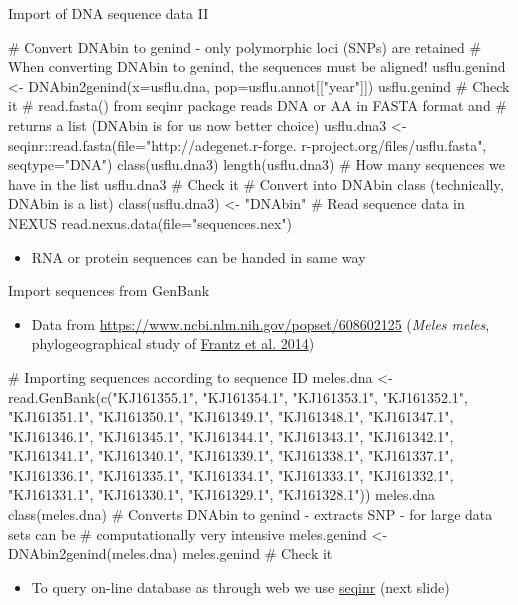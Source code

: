 \documentclass[compress, ucs, xelatex, 11pt, xcolor=svgnames,
  hyperref={
    bookmarks=true,
    unicode=true,
    colorlinks=true,
    pdftitle={Molecular data in R},
    plainpages=false,
    pdfauthor={Vojtech Zeisek},
    pdfsubject={Course about phylogeny and evolution in R},
    pdfcreator={XeLaTeX},
    pdfkeywords={R, evolution, phylogeny, molecular data},
    linkcolor=Tomato,
    anchorcolor=SaddleBrown,
    citecolor=Goldenrod,
    filecolor=DarkMagenta,
    menucolor=Sienna,
    urlcolor=DarkTurquoise,
    pdftex},
  url={hyphens, lowtilde} %
  ]{beamer}
\begin{document}
\begin{frame}[fragile]{Import of DNA sequence data II}
  \begin{spluscode}
    # Convert DNAbin to genind - only polymorphic loci (SNPs) are retained
    # When converting DNAbin to genind, the sequences must be aligned!
    usflu.genind <- DNAbin2genind(x=usflu.dna, pop=usflu.annot[["year"]])
    usflu.genind # Check it
    # read.fasta() from seqinr package reads DNA or AA in FASTA format and
    # returns a list (DNAbin is for us now better choice)
    usflu.dna3 <- seqinr::read.fasta(file="http://adegenet.r-forge.
      r-project.org/files/usflu.fasta", seqtype="DNA")
    class(usflu.dna3)
    length(usflu.dna3) # How many sequences we have in the list
    usflu.dna3 # Check it
    # Convert into DNAbin class (technically, DNAbin is a list)
    class(usflu.dna3) <- "DNAbin"
    # Read sequence data in NEXUS
    read.nexus.data(file="sequences.nex")
  \end{spluscode}
  \begin{itemize}
    \item RNA or protein sequences can be handed in same way
  \end{itemize}
\end{frame}

\begin{frame}[fragile]{Import sequences from GenBank}
  \begin{itemize}
    \item Data from \url{https://www.ncbi.nlm.nih.gov/popset/608602125} (\textit{Meles meles}, phylogeographical study of \href{https://www.nature.com/articles/hdy201445}{Frantz et al. 2014})
  \end{itemize}
  \begin{spluscode}
    # Importing sequences according to sequence ID
    meles.dna <- read.GenBank(c("KJ161355.1", "KJ161354.1", "KJ161353.1",
      "KJ161352.1", "KJ161351.1", "KJ161350.1", "KJ161349.1", "KJ161348.1",
      "KJ161347.1", "KJ161346.1", "KJ161345.1", "KJ161344.1", "KJ161343.1",
      "KJ161342.1", "KJ161341.1", "KJ161340.1", "KJ161339.1", "KJ161338.1",
      "KJ161337.1", "KJ161336.1", "KJ161335.1", "KJ161334.1", "KJ161333.1",
      "KJ161332.1", "KJ161331.1", "KJ161330.1", "KJ161329.1", "KJ161328.1"))
    meles.dna
    class(meles.dna)
    # Converts DNAbin to genind - extracts SNP - for large data sets can be
    # computationally very intensive
    meles.genind <- DNAbin2genind(meles.dna)
    meles.genind # Check it
  \end{spluscode}
  \begin{itemize}
    \item To query on-line database as through web we use \href{https://CRAN.R-project.org/package=seqinr}{seqinr} (next slide)
  \end{itemize}
\end{frame}
\end{document}
